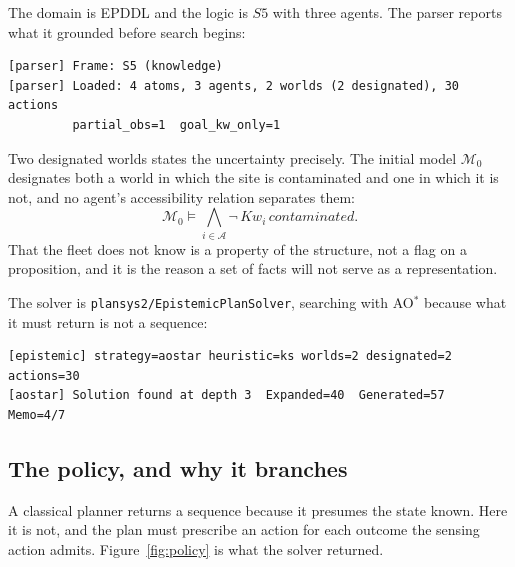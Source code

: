 \documentclass[11pt,a4paper]{article}
\theoremstyle{definition}
\newcommand{\Ag}{\mathcal{A}}
\newcommand{\Mod}{\mathcal{M}}
\newcommand{\Kw}[1]{\mathit{Kw}_{#1}}
\newcommand{\code}[1]{\texttt{\small #1}}
\begin{document}
The domain is EPDDL and the logic is $S5$ with three agents. The parser reports
what it grounded before search begins:

\begin{lstlisting}
[parser] Frame: S5 (knowledge)
[parser] Loaded: 4 atoms, 3 agents, 2 worlds (2 designated), 30 actions
         partial_obs=1  goal_kw_only=1
\end{lstlisting}

Two designated worlds states the uncertainty precisely. The initial model
$\Mod_0$ designates both a world in which the site is contaminated and one in
which it is not, and no agent's accessibility relation separates them:
\[
\Mod_0 \models \textstyle\bigwedge_{i \in \Ag} \neg\,\Kw{i}\,\mathit{contaminated}.
\]
That the fleet does not know is a property of the structure, not a flag on a
proposition, and it is the reason a set of facts will not serve as a
representation.

The solver is \code{plansys2/EpistemicPlanSolver}, searching with AO$^*$ because
what it must return is not a sequence:

\begin{lstlisting}
[epistemic] strategy=aostar heuristic=ks worlds=2 designated=2 actions=30
[aostar] Solution found at depth 3  Expanded=40  Generated=57  Memo=4/7
\end{lstlisting}

\subsection{The policy, and why it branches}

A classical planner returns a sequence because it presumes the state known.
Here it is not, and the plan must prescribe an action for each outcome the
sensing action admits. Figure~\ref{fig:policy} is what the solver returned.
\end{document}
